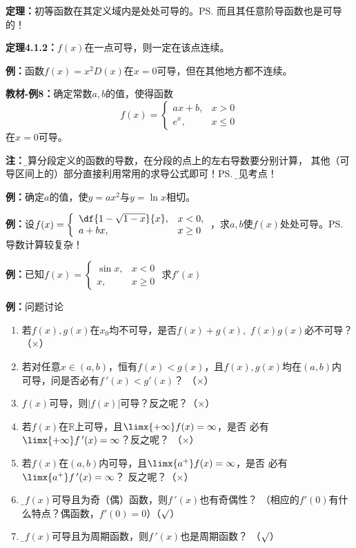 {\bf 定理：}初等函数在其定义域内是处处可导的。\ps{而且其任意阶导函数也是可导的！}

{\bf 定理4.1.2：}$f(x)$在一点可导，则一定在该点连续。

{\bf 例：}函数$f(x)=x^2D(x)$在$x=0$可导，但在其他地方都不连续。

{\bf 教材-例8：}确定常数$a,b$的值，使得函数
$$f(x)=\left\{\begin{array}{ll}ax+b,& x>0\\
e^x,& x\leq 0\end{array}\right.$$
在$x=0$可导。

{\bf 注：}{\b 计算分段定义的函数的导数，在分段的点上的左右导数要分别计算，
其他（可导区间上的）部分直接利用常用的求导公式即可！}\ps{\b 常见考点！}

{\bf 例：}确定$a$的值，使$y=ax^2$与$y=\ln x$相切。

{\bf 例：}设$f(x)=\left\{\begin{array}{ll}
\df{1-\sqrt{1-x}}{x}, & x<0,\\
a+bx, & x\geq 0
\end{array}\right.$，求$a,b$使$f(x)$处处可导。\ps{导数计算较复杂！}

{\bf 例：}已知$f(x)=\left\{\begin{array}{ll}
\sin x,& x<0\\ x,& x\geq 0
\end{array}\right.$
求$f'(x)$

{\bf 例：}问题讨论
\begin{enumerate} 
  \setlength{\itemindent}{1cm}
  \item 若$f(x),g(x)$在$x_0$均不可导，是否$f(x)+g(x),$ $f(x)g(x)$必不可导？
  （{$\times$}） 
  \item 若对任意$x\in (a,b)$，恒有$f(x)<g(x)$，且$f(x),g(x)$均在$(a,b)$内
  可导，问是否必有$f\,'(x)<g'(x)$？ （{$\times$}） 
  \item $f(x)$可导，则$|f(x)|$可导？反之呢？（{$\times$}）
  \item 若$f(x)$在$\mathbb{R}$上可导，且$\limx{+\infty}f(x)=\infty$，是否
  必有$\limx{+\infty}f\,'(x)=\infty$？反之呢？ （{$\times$}）
  \item 若$f(x)$在$(a,b)$内可导，且$\limx{a^+}f(x)=\infty$，是否
  必有$\limx{a^+}f\,'(x)=\infty$？ 反之呢？（{$\times$}） 
  \item {\b 若$f(x)$可导且为奇（偶）函数，则$f\,'(x)$也有奇偶性？ 
  （相应的$f'(0)$有什么特点？偶函数，$f'(0)=0$）（{$\surd$}）} 
  \item {\b 若$f(x)$可导且为周期函数，则$f\,'(x)$也是周期函数？ （{$\surd$}）}
\end{enumerate}

